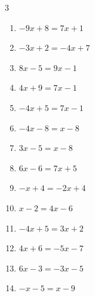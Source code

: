\begin{multicols}{3}
\begin{enumerate}
  \item $-9x+8=7x+1$


  \item $-3x+2=-4x+7$

        \phantom{$\displaystyle x=5$}

\columnbreak %

  \item $8x-5=9x-1$

        \phantom{$\displaystyle x=-4$}

  \item $4x+9=7x-1$


  \item $-4x+5=7x-1$


  \item $-4x-8=x-8$

        \phantom{$\displaystyle x=0$}

  \item $3x-5=x-8$


  \item $6x-6=7x+5$

        \phantom{$\displaystyle x=-11$}

  \item $-x+4=-2x+4$

        \phantom{$\displaystyle x=0$}

  \item $x-2=4x-6$


  \item $-4x+5=3x+2$


  \item $4x+6=-5x-7$


  \item $6x-3=-3x-5$


  \item $-x-5=x-9$

        \phantom{$\displaystyle x=2$}


\end{enumerate}
\end{multicols}
